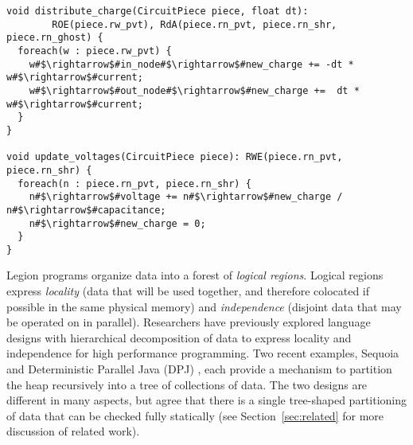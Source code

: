 \begin{lstlisting}[float={t},label={lst:code_ex},caption={Circuit simulation.}]
void distribute_charge(CircuitPiece piece, float dt):
        ROE(piece.rw_pvt), RdA(piece.rn_pvt, piece.rn_shr, piece.rn_ghost) {
  foreach(w : piece.rw_pvt) {
    w#$\rightarrow$#in_node#$\rightarrow$#new_charge += -dt * w#$\rightarrow$#current;
    w#$\rightarrow$#out_node#$\rightarrow$#new_charge +=  dt * w#$\rightarrow$#current;
  }
}

void update_voltages(CircuitPiece piece): RWE(piece.rn_pvt, piece.rn_shr) {
  foreach(n : piece.rn_pvt, piece.rn_shr) {
    n#$\rightarrow$#voltage += n#$\rightarrow$#new_charge / n#$\rightarrow$#capacitance;
    n#$\rightarrow$#new_charge = 0;
  }
}
\end{lstlisting}

Legion programs organize data into a forest of {\em logical regions}.  Logical
regions express {\em locality} (data that will be used together, and therefore colocated if possible in the same
physical memory) and {\em independence} (disjoint data that may be operated on in parallel).
Researchers have previously explored language designs with hierarchical decomposition of data to express
locality and independence for high performance programming. Two recent examples, Sequoia \cite{Fatahalion06} and 
Deterministic Parallel Java (DPJ) \cite{Bocchino09}, each provide a mechanism to partition the heap recursively
into a tree of collections of data.  The two designs are different in many aspects, but agree that there is
a single tree-shaped partitioning of data that can be checked fully statically (see Section~\ref{sec:related} for more
discussion of related work).

